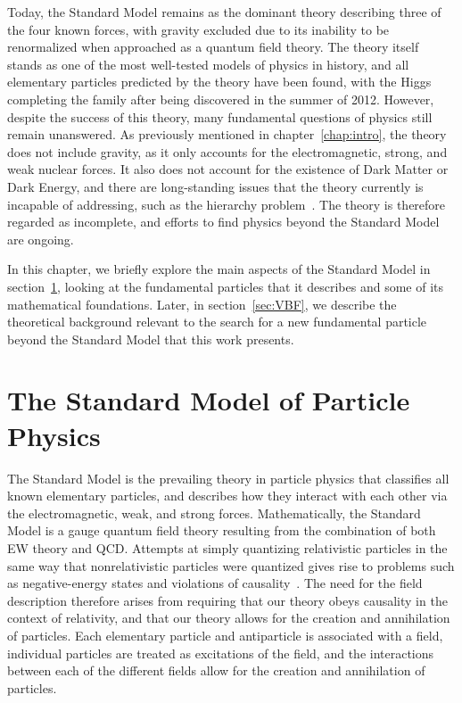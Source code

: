 Today, the Standard Model remains as the dominant theory describing three of the four known forces, with gravity excluded due to its inability to be renormalized when approached as a quantum field theory.
The theory itself stands as one of the most well-tested models of physics in history, and all elementary particles predicted by the theory have been found, with the Higgs completing the family after being discovered in the summer of 2012. %
However, despite the success of this theory, many fundamental questions of physics still remain unanswered.
As previously mentioned in chapter~\ref{chap:intro}, the theory does not include gravity, as it only accounts for the electromagnetic, strong, and weak nuclear forces.
It also does not account for the existence of Dark Matter or Dark Energy, and there are long-standing issues that the theory currently is incapable of addressing, such as the hierarchy problem~\cite{krippendorf2010cambridge}.
The theory is therefore regarded as incomplete, and efforts to find physics beyond the Standard Model are ongoing.

In this chapter, we briefly explore the main aspects of the Standard Model in section~\ref{sec:SM}, looking at the fundamental particles that it describes and some of its mathematical foundations.
Later, in section~\ref{sec:VBF}, we describe the theoretical background relevant to the search for a new fundamental particle beyond the Standard Model that this work presents.

\section{The Standard Model of Particle Physics}
\label{sec:SM}

The Standard Model is the prevailing theory in particle physics that classifies all known elementary particles, and describes how they interact with each other via the electromagnetic, weak, and strong forces.
Mathematically, the Standard Model is a gauge quantum field theory resulting from the combination of both EW theory and QCD.
Attempts at simply quantizing relativistic particles in the same way that nonrelativistic particles were quantized gives rise to problems such as negative-energy states and violations of causality~\cite{Peskin:257493}.
The need for the field description therefore arises from requiring that our theory obeys causality in the context of relativity, and that our theory allows for the creation and annihilation of particles.
Each elementary particle and antiparticle is associated with a field, individual particles are treated as excitations of the field, and the interactions between each of the different fields allow for the creation and annihilation of particles.

